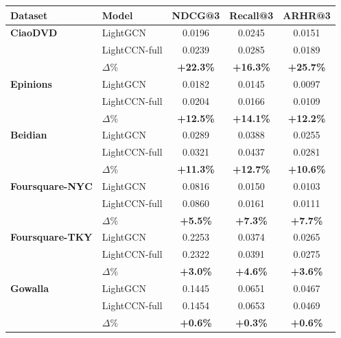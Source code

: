 \begin{tabular}{llccc}
\toprule
Dataset & Model & NDCG@3 & Recall@3 & ARHR@3 \\
\midrule
\textbf{CiaoDVD} & LightGCN & 0.0196 & 0.0245 & 0.0151 \\
 & LightCCN-full & 0.0239 & 0.0285 & 0.0189 \\
 & $\Delta$\% & \textbf{+22.3\%} & \textbf{+16.3\%} & \textbf{+25.7\%} \\
\addlinespace
\textbf{Epinions} & LightGCN & 0.0182 & 0.0145 & 0.0097 \\
 & LightCCN-full & 0.0204 & 0.0166 & 0.0109 \\
 & $\Delta$\% & \textbf{+12.5\%} & \textbf{+14.1\%} & \textbf{+12.2\%} \\
\addlinespace
\textbf{Beidian} & LightGCN & 0.0289 & 0.0388 & 0.0255 \\
 & LightCCN-full & 0.0321 & 0.0437 & 0.0281 \\
 & $\Delta$\% & \textbf{+11.3\%} & \textbf{+12.7\%} & \textbf{+10.6\%} \\
\addlinespace
\textbf{Foursquare-NYC} & LightGCN & 0.0816 & 0.0150 & 0.0103 \\
 & LightCCN-full & 0.0860 & 0.0161 & 0.0111 \\
 & $\Delta$\% & \textbf{+5.5\%} & \textbf{+7.3\%} & \textbf{+7.7\%} \\
\addlinespace
\textbf{Foursquare-TKY} & LightGCN & 0.2253 & 0.0374 & 0.0265 \\
 & LightCCN-full & 0.2322 & 0.0391 & 0.0275 \\
 & $\Delta$\% & \textbf{+3.0\%} & \textbf{+4.6\%} & \textbf{+3.6\%} \\
\addlinespace
\textbf{Gowalla} & LightGCN & 0.1445 & 0.0651 & 0.0467 \\
 & LightCCN-full & 0.1454 & 0.0653 & 0.0469 \\
 & $\Delta$\% & \textbf{+0.6\%} & \textbf{+0.3\%} & \textbf{+0.6\%} \\
\bottomrule
\end{tabular}
